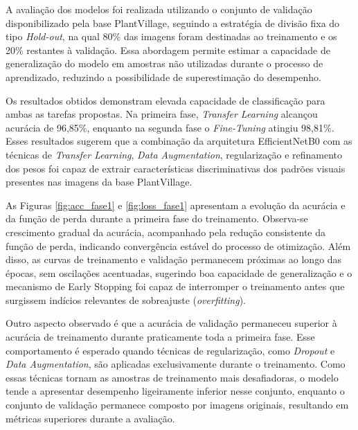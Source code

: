 \documentclass[portuguese]{sbc2025}%
\begin{document}
A avaliação dos modelos foi realizada utilizando o conjunto de validação disponibilizado pela base PlantVillage, seguindo a estratégia
de divisão fixa do tipo \textit{Hold-out}, na qual 80\% das imagens foram destinadas ao treinamento e os 20\% restantes 
à validação. Essa abordagem permite estimar a capacidade de generalização do modelo em amostras não utilizadas durante o processo 
de aprendizado, reduzindo a possibilidade de superestimação do desempenho.

Os resultados obtidos demonstram elevada capacidade de classificação para ambas as tarefas propostas. Na primeira fase,
\textit{Transfer Learning} alcançou acurácia de 96,85\%, enquanto na segunda fase o \textit{Fine-Tuning} atingiu 
98,81\%. Esses resultados sugerem que a combinação da arquitetura EfficientNetB0 com as técnicas de \textit{Transfer Learning},
\textit{Data Augmentation}, regularização e refinamento dos pesos foi capaz de extrair características discriminativas dos padrões
visuais presentes nas imagens da base PlantVillage.

As Figuras \ref{fig:acc_fase1} e \ref{fig:loss_fase1} apresentam a evolução da acurácia e da função de perda durante a primeira fase 
do treinamento. Observa-se crescimento gradual da acurácia, acompanhado pela redução consistente da função de perda, indicando 
convergência estável do processo de otimização. Além disso, as curvas de treinamento e validação permanecem próximas ao longo das 
épocas, sem oscilações acentuadas, sugerindo boa capacidade de generalização e o mecanismo de Early Stopping foi capaz de interromper
o treinamento antes que surgissem indícios relevantes de sobreajuste (\textit{overfitting}).

Outro aspecto observado é que a acurácia de validação permaneceu superior à acurácia de treinamento durante praticamente toda a 
primeira fase. Esse comportamento é esperado quando técnicas de regularização, como \textit{Dropout} e \textit{Data Augmentation}, 
são aplicadas exclusivamente durante o treinamento. Como essas técnicas tornam as amostras de treinamento mais desafiadoras, 
o modelo tende a apresentar desempenho ligeiramente inferior nesse conjunto, enquanto o conjunto de validação permanece composto por
imagens originais, resultando em métricas superiores durante a avaliação.
\end{document}
